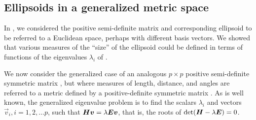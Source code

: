 \subsection{Ellipsoids in a generalized metric space}


In , we considered the positive semi-definite matrix  and
corresponding ellipsoid to be
referred to a Euclidean space, perhaps with different basis vectors.
We showed that various measures of the ``size'' of the ellipsoid could be defined
in terms of functions of the eigenvalues $\lambda_i$ of .

We now consider the generalized
case of an analogous $p \times p$ positive semi-definite symmetric matrix , but where measures of
length, distance, and angles are referred to a metric defined by a positive-definite symmetric
matrix . As is well known, the generalized eigenvalue problem is to find the scalars
$\lambda_i$ and vectors $\vec{v}_i, i=1, 2, \dots p$,
such that $\bm{H} \bm{v} = \lambda \bm{E} \bm{v}$, that is, the roots of
$\mathrm{det} (\bm{H} - \lambda \bm{E})=0$.

